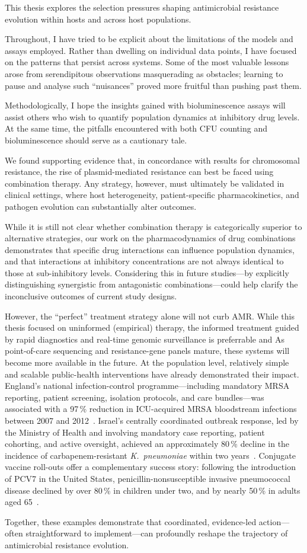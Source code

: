 \documentclass[../main.tex]{subfiles}
\begin{document}
This thesis explores the selection pressures shaping antimicrobial resistance evolution within hosts and across host populations.

Throughout, I have tried to be explicit about the limitations of the models and assays employed. Rather than dwelling on individual data points, I have focused on the patterns that persist across systems. Some of the most valuable lessons arose from serendipitous observations masquerading as obstacles; learning to pause and analyse such “nuisances” proved more fruitful than pushing past them.

Methodologically, I hope the insights gained with bioluminescence assays will assist others who wish to quantify population dynamics at inhibitory drug levels. At the same time, the pitfalls encountered with both CFU counting and bioluminescence should serve as a cautionary tale.

We found supporting evidence that, in concordance with results for chromosomal resistance, the rise of plasmid-mediated resistance can best be faced using combination therapy. Any strategy, however, must ultimately be validated in clinical settings, where host heterogeneity, patient-specific pharmacokinetics, and pathogen evolution can substantially alter outcomes.

While it is still not clear whether combination therapy is categorically superior to alternative strategies, our work on the pharmacodynamics of drug combinations demonstrates that specific drug interactions can influence population dynamics, and that interactions at inhibitory concentrations are not always identical to those at sub-inhibitory levels. Considering this in future studies—by explicitly distinguishing synergistic from antagonistic combinations—could help clarify the inconclusive outcomes of current study designs.

However, the “perfect” treatment strategy alone will not curb AMR.
While this thesis focused on uninformed (empirical) therapy, the informed treatment guided by rapid diagnostics and real-time genomic surveillance is preferrable and
As point-of-care sequencing and resistance-gene panels mature, these systems will become more available in the future.
At the population level, relatively simple and scalable public-health interventions have already demonstrated their impact.
England’s national infection-control programme—including mandatory MRSA reporting, patient screening, isolation protocols, and care bundles—was associated with a 97\,\% reduction in ICU-acquired MRSA bloodstream infections between 2007 and 2012~\cite{Edgeworth2020}.
Israel’s centrally coordinated outbreak response, led by the Ministry of Health and involving mandatory case reporting, patient cohorting, and active oversight, achieved an approximately 80\,\% decline in the incidence of carbapenem-resistant \textit{K.~pneumoniae} within two years~\cite{Schwaber2011}.
Conjugate vaccine roll-outs offer a complementary success story: following the introduction of PCV7 in the United States, penicillin-nonsusceptible invasive pneumococcal disease declined by over 80\,\% in children under two, and by nearly 50\,\% in adults aged 65~\cite{Kyaw2006}.

Together, these examples demonstrate that coordinated, evidence-led action—often straightforward to implement—can profoundly reshape the trajectory of antimicrobial resistance evolution.
\end{document}
